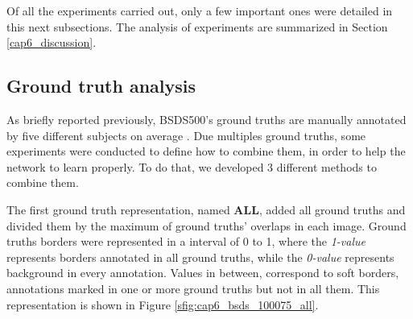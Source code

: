 Of all the experiments carried out, only a few important ones were detailed in this next subsections.
The analysis of experiments are summarized in Section \ref{cap6_discussion}.

\subsection{Ground truth analysis}
\label{ssec:groundtruth_analysis}

As briefly reported previously, BSDS500's ground truths are manually annotated by five different subjects on average \cite{amfm_pami2011}.
Due multiples ground truths, some experiments were conducted to define how to combine them, in order to help the network to learn properly.
To do that, we developed 3 different methods to combine them.

The first ground truth representation, named \textbf{ALL}, added all ground truths and divided them by the maximum of ground truths' overlaps in each image.
Ground truths borders were represented in a interval of 0 to 1, where the \textit{1-value} represents borders annotated in all ground truths, while the \textit{0-value} represents background in every annotation.
Values in between, correspond to soft borders, annotations marked in one or more ground truths but not in all them.
This representation is shown in Figure \ref{sfig:cap6_bsds_100075_all}.

